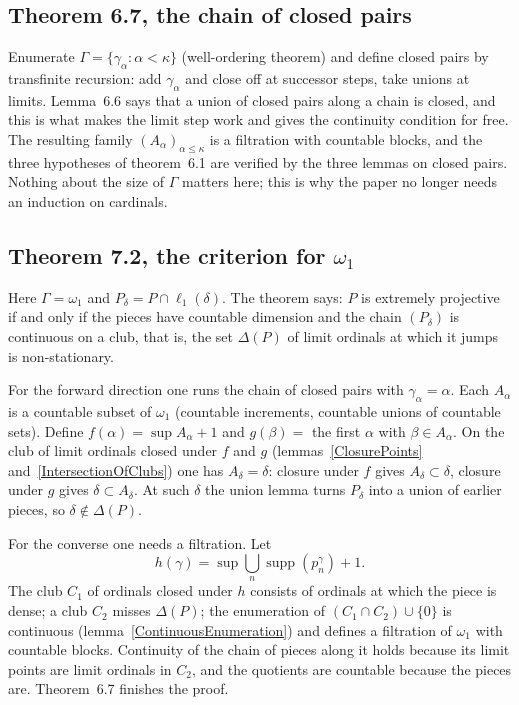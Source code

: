 \documentclass[12pt]{article}
\theoremstyle{definition}
\theoremstyle{remark}
\newcommand{\ellone}[1]{\ell_1(#1)}
\newcommand{\supp}{\operatorname{supp}}
\begin{document}
\subsection*{Theorem 6.7, the chain of closed pairs}

Enumerate $\Gamma=\{\gamma_\alpha:\alpha<\kappa\}$ (well-ordering theorem)
and define closed pairs by transfinite recursion: add $\gamma_\alpha$ and
close off at successor steps, take unions at limits. Lemma~6.6 says that a
union of closed pairs along a chain is closed, and this is what makes the
limit step work and gives the continuity condition for free. The resulting
family ${(A_\alpha)}_{\alpha\leq\kappa}$ is a filtration with countable blocks,
and the three hypotheses of theorem~6.1 are verified by the three lemmas on
closed pairs. Nothing about the size of $\Gamma$ matters here; this is why
the paper no longer needs an induction on cardinals.

\subsection*{Theorem 7.2, the criterion for $\omega_1$}

Here $\Gamma=\omega_1$ and $P_\delta=P\cap\ellone{\delta}$. The theorem says:
$P$ is extremely projective if and only if the pieces have countable
dimension and the chain ${(P_\delta)}$ is continuous on a club, that is, the
set $\Delta(P)$ of limit ordinals at which it jumps is non-stationary.

For the forward direction one runs the chain of closed pairs with
$\gamma_\alpha=\alpha$. Each $A_\alpha$ is a countable subset of $\omega_1$
(countable increments, countable unions of countable sets). Define
$f(\alpha)=\sup A_\alpha+1$ and $g(\beta)=$ the first $\alpha$ with
$\beta\in A_\alpha$. On the club of limit ordinals closed under $f$ and $g$
(lemmas~\ref{ClosurePoints} and~\ref{IntersectionOfClubs}) one has
$A_\delta=\delta$: closure under $f$ gives $A_\delta\subset\delta$, closure
under $g$ gives $\delta\subset A_\delta$. At such $\delta$ the union lemma
turns $P_\delta$ into a union of earlier pieces, so $\delta\notin\Delta(P)$.

For the converse one needs a filtration. Let
\[
h(\gamma)=\sup\textstyle\bigcup_n\supp(p^\gamma_n)+1 .
\]
The club $C_1$ of ordinals closed under $h$ consists of ordinals at
which the piece is dense; a club $C_2$ misses $\Delta(P)$; the enumeration
of $(C_1\cap C_2)\cup\{0\}$ is continuous
(lemma~\ref{ContinuousEnumeration}) and
defines a filtration of $\omega_1$ with countable blocks. Continuity of the
chain of pieces along it holds because its limit points are limit ordinals
in $C_2$, and the quotients are countable because the pieces are. Theorem~6.7
finishes the proof.
\end{document}
